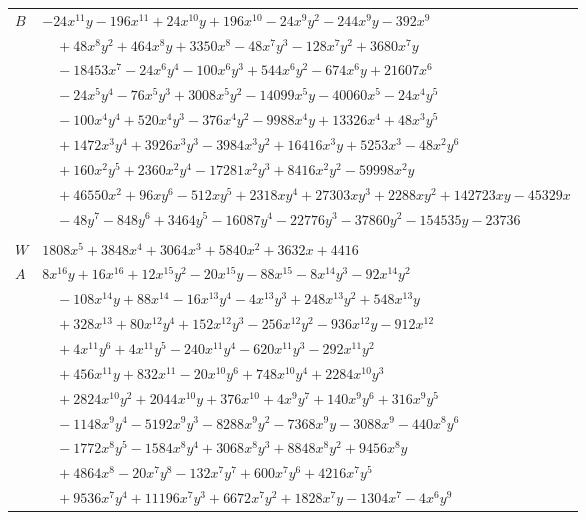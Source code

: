 \documentclass[11pt]{article}
\begin{document}
\begin{longtable}{@{}ll@{}}
$B$ & $-24x^{11}y-196x^{11}+24x^{10}y+196x^{10}-24x^{9}y^{2}-244x^{9}y-392x^{9}$\\
 & $\quad +48x^{8}y^{2}+464x^{8}y+3350x^{8}-48x^{7}y^{3}-128x^{7}y^{2}+3680x^{7}y$\\
 & $\quad -18453x^{7}-24x^{6}y^{4}-100x^{6}y^{3}+544x^{6}y^{2}-674x^{6}y+21607x^{6}$\\
 & $\quad -24x^{5}y^{4}-76x^{5}y^{3}+3008x^{5}y^{2}-14099x^{5}y-40060x^{5}-24x^{4}y^{5}$\\
 & $\quad -100x^{4}y^{4}+520x^{4}y^{3}-376x^{4}y^{2}-9988x^{4}y+13326x^{4}+48x^{3}y^{5}$\\
 & $\quad +1472x^{3}y^{4}+3926x^{3}y^{3}-3984x^{3}y^{2}+16416x^{3}y+5253x^{3}-48x^{2}y^{6}$\\
 & $\quad +160x^{2}y^{5}+2360x^{2}y^{4}-17281x^{2}y^{3}+8416x^{2}y^{2}-59998x^{2}y$\\
 & $\quad +46550x^{2}+96xy^{6}-512xy^{5}+2318xy^{4}+27303xy^{3}+2288xy^{2}+142723xy-45329x$\\
 & $\quad -48y^{7}-848y^{6}+3464y^{5}-16087y^{4}-22776y^{3}-37860y^{2}-154535y-23736$\\
\addlinespace[3pt]
\multicolumn{2}{@{}l}{$g=2$, $i=39$, $m=2$, neighbours $7,9,10,13,14,17,25,28,29,32,35,36,37,42$}\\
$W$ & $1808x^{5}+3848x^{4}+3064x^{3}+5840x^{2}+3632x+4416$\\
$A$ & $8x^{16}y+16x^{16}+12x^{15}y^{2}-20x^{15}y-88x^{15}-8x^{14}y^{3}-92x^{14}y^{2}$\\
 & $\quad -108x^{14}y+88x^{14}-16x^{13}y^{4}-4x^{13}y^{3}+248x^{13}y^{2}+548x^{13}y$\\
 & $\quad +328x^{13}+80x^{12}y^{4}+152x^{12}y^{3}-256x^{12}y^{2}-936x^{12}y-912x^{12}$\\
 & $\quad +4x^{11}y^{6}+4x^{11}y^{5}-240x^{11}y^{4}-620x^{11}y^{3}-292x^{11}y^{2}$\\
 & $\quad +456x^{11}y+832x^{11}-20x^{10}y^{6}+748x^{10}y^{4}+2284x^{10}y^{3}$\\
 & $\quad +2824x^{10}y^{2}+2044x^{10}y+376x^{10}+4x^{9}y^{7}+140x^{9}y^{6}+316x^{9}y^{5}$\\
 & $\quad -1148x^{9}y^{4}-5192x^{9}y^{3}-8288x^{9}y^{2}-7368x^{9}y-3088x^{9}-440x^{8}y^{6}$\\
 & $\quad -1772x^{8}y^{5}-1584x^{8}y^{4}+3068x^{8}y^{3}+8848x^{8}y^{2}+9456x^{8}y$\\
 & $\quad +4864x^{8}-20x^{7}y^{8}-132x^{7}y^{7}+600x^{7}y^{6}+4216x^{7}y^{5}$\\
 & $\quad +9536x^{7}y^{4}+11196x^{7}y^{3}+6672x^{7}y^{2}+1828x^{7}y-1304x^{7}-4x^{6}y^{9}$\\

\end{longtable}
\end{document}

